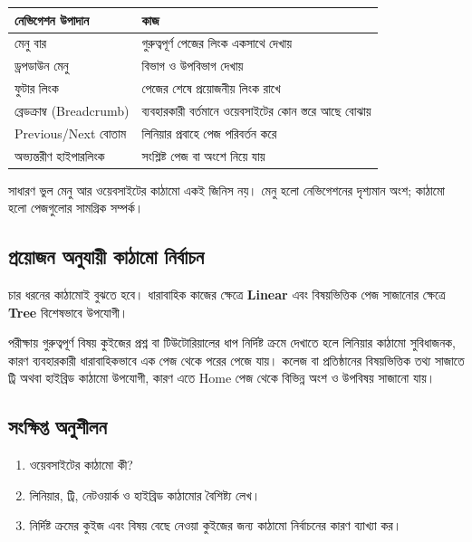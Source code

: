 \begin{center}
\begin{tabular}{|p{}|p{}|}
\hline
\textbf{নেভিগেশন উপাদান} & \textbf{কাজ} \\
\hline
মেনু বার & গুরুত্বপূর্ণ পেজের লিংক একসাথে দেখায় \\
\hline
ড্রপডাউন মেনু & বিভাগ ও উপবিভাগ দেখায় \\
\hline
ফুটার লিংক & পেজের শেষে প্রয়োজনীয় লিংক রাখে \\
\hline
ব্রেডক্রাম্ব (Breadcrumb) & ব্যবহারকারী বর্তমানে ওয়েবসাইটের কোন স্তরে আছে বোঝায় \\
\hline
Previous/Next বোতাম & লিনিয়ার প্রবাহে পেজ পরিবর্তন করে \\
\hline
অভ্যন্তরীণ হাইপারলিংক & সংশ্লিষ্ট পেজ বা অংশে নিয়ে যায় \\
\hline
\end{tabular}
\end{center}

\begin{mistakebox}{সাধারণ ভুল}
মেনু আর ওয়েবসাইটের কাঠামো একই জিনিস নয়। মেনু হলো নেভিগেশনের দৃশ্যমান অংশ; কাঠামো হলো পেজগুলোর সামগ্রিক সম্পর্ক।
\end{mistakebox}

\subsection{প্রয়োজন অনুযায়ী কাঠামো নির্বাচন}

চার ধরনের কাঠামোই বুঝতে হবে। ধারাবাহিক কাজের ক্ষেত্রে \textbf{Linear} এবং বিষয়ভিত্তিক পেজ সাজানোর ক্ষেত্রে \textbf{Tree} বিশেষভাবে উপযোগী।

\begin{keypointbox}{পরীক্ষায় গুরুত্বপূর্ণ বিষয়}
কুইজের প্রশ্ন বা টিউটোরিয়ালের ধাপ নির্দিষ্ট ক্রমে দেখাতে হলে লিনিয়ার কাঠামো সুবিধাজনক, কারণ ব্যবহারকারী ধারাবাহিকভাবে এক পেজ থেকে পরের পেজে যায়। কলেজ বা প্রতিষ্ঠানের বিষয়ভিত্তিক তথ্য সাজাতে ট্রি অথবা হাইব্রিড কাঠামো উপযোগী, কারণ এতে Home পেজ থেকে বিভিন্ন অংশ ও উপবিষয় সাজানো যায়।
\end{keypointbox}





\subsection{সংক্ষিপ্ত অনুশীলন}
\begin{enumerate}
\item ওয়েবসাইটের কাঠামো কী?
\item লিনিয়ার, ট্রি, নেটওয়ার্ক ও হাইব্রিড কাঠামোর বৈশিষ্ট্য লেখ।
\item নির্দিষ্ট ক্রমের কুইজ এবং বিষয় বেছে নেওয়া কুইজের জন্য কাঠামো নির্বাচনের কারণ ব্যাখ্যা কর।
\end{enumerate}

